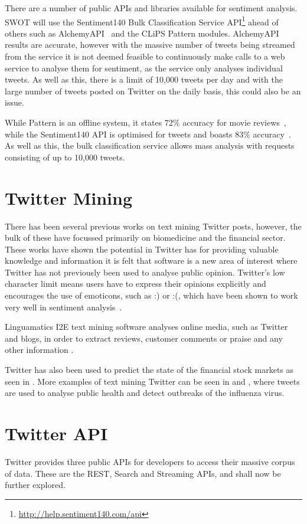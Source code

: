 There are a number of public APIs and libraries available for sentiment analysis. SWOT will use the Sentiment140 Bulk Classification Service API\footnote{\url{http://help.sentiment140.com/api}} ahead of others such as AlchemyAPI~\cite{alchemyapi} and the CLiPS Pattern modules. 
AlchemyAPI results are accurate, however with the massive number of tweets being streamed from the service it is not deemed feasible to continuously make calls to a web service to analyse them for sentiment, as the service only analyses individual tweets. As well as this, there is a limit of 10,000 tweets per day and with the large number of tweets posted on Twitter on the daily basis, this could also be an issue.

While Pattern is an offline system, it states 72\% accuracy for movie reviews~\cite{pattern}, while the Sentiment140 API is optimised for tweets and boasts 83\% accuracy~\cite{Go_Bhayani_Huang_2009}. As well as this, the bulk classification service allows mass analysis with requests consisting of up to 10,000 tweets.

\section{Twitter Mining}
There has been several previous works on text mining Twitter posts, however, the bulk of these have focussed primarily on biomedicine and the financial sector. These works have shown the potential in Twitter has for providing valuable knowledge and information it is felt that software is a new area of interest where Twitter has not previously been used to analyse public opinion. Twitter's low character limit means users have to express their opinions explicitly and encourages the use of emoticons, such as :) or :(, which have been shown to work very well in sentiment analysis~\cite{Read:2005}.

Linguamatics I2E text mining software analyses online media, such as Twitter and blogs, in order to extract reviews, customer comments or praise and any other information \cite{linguamatics}.

Twitter has also been used to predict the state of the financial stock markets as seen in \cite{Bollen11}. More examples of text mining Twitter can be seen in \cite{PaulD11} and \cite{culotta10}, where tweets are used to analyse public health and detect outbreaks of the influenza virus. 

\section{Twitter API}
Twitter provides three public APIs for developers to access their massive corpus of data. These are the REST, Search and Streaming APIs, and shall now be further explored.

